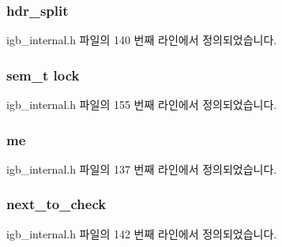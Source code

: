 \subsubsection[{\texorpdfstring{hdr\+\_\+split}{hdr_split}}]{ hdr\+\_\+split}\hypertarget{structrx__ring_adad11ae5252d67c74a0c96122e7909c8}{}\label{structrx__ring_adad11ae5252d67c74a0c96122e7909c8}


igb\+\_\+internal.\+h 파일의 140 번째 라인에서 정의되었습니다.

\subsubsection[{\texorpdfstring{lock}{lock}}]{\setlength{\rightskip}{0pt plus 5cm}sem\+\_\+t lock}\hypertarget{structrx__ring_ac301e000199ad937f060277b0736d4e1}{}\label{structrx__ring_ac301e000199ad937f060277b0736d4e1}


igb\+\_\+internal.\+h 파일의 155 번째 라인에서 정의되었습니다.

\subsubsection[{\texorpdfstring{me}{me}}]{ me}\hypertarget{structrx__ring_af754e6af13b532f2bebcaa3828ea795c}{}\label{structrx__ring_af754e6af13b532f2bebcaa3828ea795c}


igb\+\_\+internal.\+h 파일의 137 번째 라인에서 정의되었습니다.

\subsubsection[{\texorpdfstring{next\+\_\+to\+\_\+check}{next_to_check}}]{ next\+\_\+to\+\_\+check}\hypertarget{structrx__ring_a3a6765383612ad483dfc252f8a16a87d}{}\label{structrx__ring_a3a6765383612ad483dfc252f8a16a87d}


igb\+\_\+internal.\+h 파일의 142 번째 라인에서 정의되었습니다.

